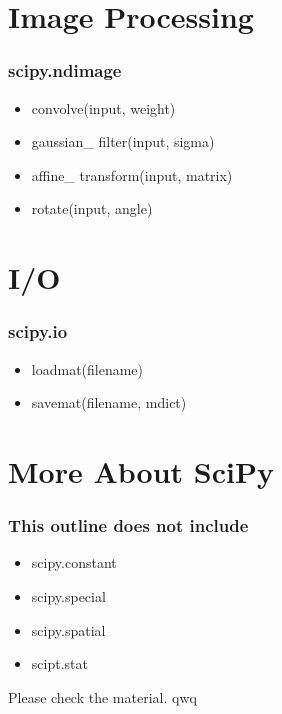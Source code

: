 \documentclass[english, nochinese]{beamer}
\begin{document}
\section{Image Processing}
\begin{frame}
\frametitle{scipy.ndimage}
\begin{itemize}
\item convolve(input, weight)
\item gaussian\_ filter(input, sigma)
\item affine\_ transform(input, matrix)
\item rotate(input, angle)
\end{itemize}
\end{frame}

\section{I/O}
\begin{frame}
\frametitle{scipy.io}
\begin{itemize}
\item loadmat(filename)
\item savemat(filename, mdict)
\end{itemize}
\end{frame}

\section{More About SciPy}
\begin{frame}
\frametitle{This outline does not include}
\begin{itemize}
\item scipy.constant
\item scipy.special
\item scipy.spatial
\item scipt.stat
\end{itemize}
Please check the material. qwq
\end{frame}
\end{document}
